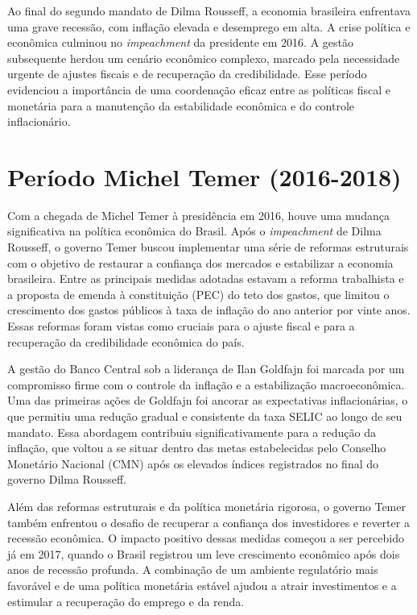 \documentclass[12pt,oneside,a4paper,chapter=TITLE,english,brazil,sumario=abnt-6027-2012]{abntex2}
\begin{document}
Ao final do segundo mandato de Dilma Rousseff, a economia brasileira enfrentava uma grave recessão, com inflação elevada e desemprego em alta. A crise política e econômica culminou no \textit{impeachment} da presidente em 2016. A gestão subsequente herdou um cenário econômico complexo, marcado pela necessidade urgente de ajustes fiscais e de recuperação da credibilidade. Esse período evidenciou a importância de uma coordenação eficaz entre as políticas fiscal e monetária para a manutenção da estabilidade econômica e do controle inflacionário.

\section{Período Michel Temer (2016-2018)}

Com a chegada de Michel Temer à presidência em 2016, houve uma mudança significativa na política econômica do Brasil. Após o \textit{impeachment} de Dilma Rousseff, o governo Temer buscou implementar uma série de reformas estruturais com o objetivo de restaurar a confiança dos mercados e estabilizar a economia brasileira. Entre as principais medidas adotadas estavam a reforma trabalhista e a  proposta de emenda à constituição (PEC) do teto dos gastos, que limitou o crescimento dos gastos públicos à taxa de inflação do ano anterior por vinte anos. Essas reformas foram vistas como cruciais para o ajuste fiscal e para a recuperação da credibilidade econômica do país.

A gestão do Banco Central sob a liderança de Ilan Goldfajn foi marcada por um compromisso firme com o controle da inflação e a estabilização macroeconômica. Uma das primeiras ações de Goldfajn foi ancorar as expectativas inflacionárias, o que permitiu uma redução gradual e consistente da taxa SELIC ao longo de seu mandato. Essa abordagem contribuiu significativamente para a redução da inflação, que voltou a se situar dentro das metas estabelecidas pelo Conselho Monetário Nacional (CMN) após os elevados índices registrados no final do governo Dilma Rousseff.

Além das reformas estruturais e da política monetária rigorosa, o governo Temer também enfrentou o desafio de recuperar a confiança dos investidores e reverter a recessão econômica. O impacto positivo dessas medidas começou a ser percebido já em 2017, quando o Brasil registrou um leve crescimento econômico após dois anos de recessão profunda. A combinação de um ambiente regulatório mais favorável e de uma política monetária estável ajudou a atrair investimentos e a estimular a recuperação do emprego e da renda.
\end{document}
